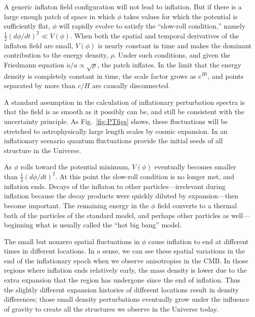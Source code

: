 A generic inflaton field configuration will not lead to inflation. But if there is a large enough patch of space in which $\phi$ takes values for which the potential is sufficiently flat, $\phi$ will rapidly evolve to satisfy the ``slow-roll condition,'' namely $\frac{1}{2} \left(d\phi/dt\right)^2 \ll V(\phi)$. When both the spatial and temporal derivatives of the inflaton field are small, $V(\phi)$ is nearly constant in time and makes the dominant contribution to the energy density, $\rho$. Under such conditions, and given the Friedmann equation $\dot a/a \propto \sqrt{\rho}$, the patch inflates. In the limit that the energy density is completely constant in time, the scale factor grows as $e^{H t}$, and points separated by more than $c/H$ are causally disconnected.

A standard assumption in the calculation of inflationary perturbation spectra is that the field is as smooth as it possibly can be, and still be consistent with the uncertainty principle. As Fig.~\ref{fig:PTfigs} shows, these fluctuations will be stretched to astrophysically large length scales by cosmic expansion. In an inflationary scenario quantum fluctuations provide the initial seeds of all structure in the Universe. 

As $\phi$ rolls toward the potential minimum, $V(\phi)$ eventually becomes smaller than $\frac{1}{2}(d\phi/dt)^2$. At this point the slow-roll condition is no longer met, and inflation ends. Decays of the inflaton to other particles---irrelevant during inflation because the decay products were quickly diluted by expansion---then become important. The remaining energy in the $\phi$ field converts to a thermal bath of the particles of the standard model, and perhaps other particles as well---beginning what is usually called the ``hot big bang'' model.

The small but nonzero spatial fluctuations in $\phi$ cause inflation to end at different times in different locations. In a sense, we can see these spatial variations in the end of the inflationary epoch when we observe anisotropies in the CMB.  In those regions where inflation ends relatively early, the mass density is lower due to the extra expansion that the region has undergone since the end of inflation. Thus the slightly different expansion histories of different locations result in density differences; those small density perturbations eventually grow under the influence of gravity to create all the structures we observe in the Universe today.

